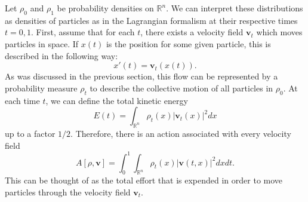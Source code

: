 \documentclass[12pt]{article}
\newcommand{\R}{\mathbb{R}}
\theoremstyle{plain}
\numberwithin{equation}{section}
\begin{document}
Let $\rho_0$ and $\rho_1$ be probability densities on $\R^n$. We can interpret these distributions as densities of particles as in the Lagrangian formalism at their respective times $t=0,1$. First, assume that for each $t$, there exists a velocity field $\mathbf{v}_t$ which moves particles in space. If $x(t)$ is the position for some given particle, this is described in the following way:
\[x'(t) = \mathbf{v}_t(x(t)).\]
As was discussed in the previous section, this flow can be represented by a probability measure $\rho_t$ to describe the collective motion of all particles in $\rho_0$. At each time $t$, we can define the total kinetic energy 
\[E(t) = \int_{\R^n} \rho_t(x)|\mathbf{v}_t(x)|^2dx\]
up to a factor $1/2$. Therefore, there is an action associated with every velocity field
\[A[\rho,\mathbf{v}] = \int_0^1\int_{\mathbb{R}^n} \rho_t(x)|\mathbf{v}(t,x)|^2dxdt.\]
This can be thought of as the total effort that is expended in order to move particles through the velocity field $\mathbf{v}_t$.  
\end{document}
